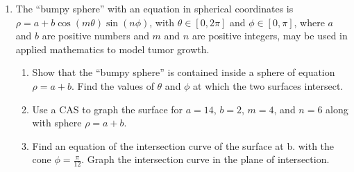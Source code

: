 \documentclass{exercises}
\begin{document}
\begin{enumerate}[resume]
\begin{enumerate}[label=(\alph*)]
  \item If $R=r$, the surface is called a horn torus. Show that the equation of a horn torus in spherical coordinates is $\rho=2R\sin \phi$.
  \item Use a CAS to graph the horn torus with $R=r=2$ in spherical coordinates.
\end{enumerate}
\item \techrequired The ``bumpy sphere'' with an equation in spherical coordinates is $\rho=a+b\cos(m\theta)\sin(n\phi)$, with $\theta \in[0,2\pi]$ and $\phi \in[0,\pi]$, where $a$ and $b$ are positive numbers and $m$ and $n$ are positive integers, may be used in applied mathematics to model tumor growth.
\begin{enumerate}[label=(\alph*)]
  \item Show that the ``bumpy sphere'' is contained inside a sphere of equation $\rho=a+b$. Find the values of $\theta$ and $\phi$ at which the two surfaces intersect.
  \item Use a CAS to graph the surface for $a=14$, $b=2$, $m=4$, and $n=6$ along with sphere $\rho=a+b$.
  \item Find an equation of the intersection curve of the surface at b. with the cone $\phi=\frac{\pi}{12}$. Graph the intersection curve in the plane of intersection.
\end{enumerate}
\end{enumerate}
\end{document}
